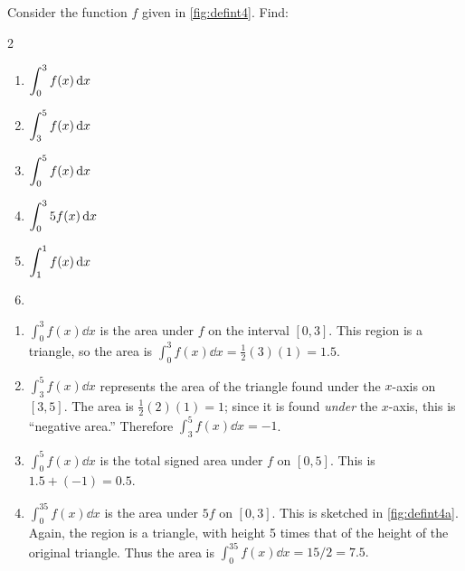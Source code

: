 \begin{example}\label{ex_defint4}%
Consider the function $f$ given in \autoref{fig:defint4}. Find:
%
%
\begin{multicols}{2}
\begin{enumerate}
	\item	$\displaystyle \int_0^3 f(x)\operatorname{d}\! x$
	\item	$\displaystyle \int_3^5 f(x)\operatorname{d}\! x$
	\item	$\displaystyle \int_0^5 f(x)\operatorname{d}\! x$
	\item	$\displaystyle \int_0^3 5f(x)\operatorname{d}\! x$
	\item	$\displaystyle \int_1^1 f(x)\operatorname{d}\! x$
	\item[]
\end{enumerate}
\end{multicols}
\solution
\begin{enumerate}
	\item	$ \int_0^3 f(x)\dd x$ is the area under $f$ on the interval $[0,3]$. This region is a triangle, so the area is $\int_0^3 f(x)\dd x=\frac12(3)(1) = 1.5$. 
	\item	$\int_3^5 f(x)\dd x$ represents the area of the triangle found under the $x$-axis on $[3,5]$. The area is $\frac12(2)(1) = 1$; since it is found \emph{under} the $x$-axis, this is ``negative area.'' Therefore $ \int_3^5 f(x)\dd x = -1$.
	\item	$ \int_0^5f(x)\dd x$ is the total signed area under $f$ on $[0,5]$. This is $1.5 + (-1) = 0.5$.
	\item	$ \int_0^35f(x)\dd x$ is the area under $5f$ on $[0,3]$. This is sketched in \autoref{fig:defint4a}. Again, the region is a triangle, with height 5 times that of the height of the original triangle. Thus the area is $ \int_0^35f(x)\dd x = 15/2 = 7.5.$
		

\end{enumerate}
\end{example}
